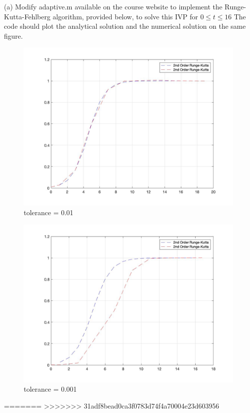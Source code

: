 \documentclass{article}
\begin{document}
\noindent
(a) Modify adaptive.m available on the course website to implement the Runge-Kutta-Fehlberg algorithm, provided below, to solve this IVP for $0 \leq t \leq 16$ The code should plot the analytical solution and the numerical solution on the same figure.



\begin{figure}[H]
  \includegraphics[width=\linewidth]{docs/01-rfk.jpg}
  \caption{tolerance = 0.01}
\end{figure}


\begin{figure}[H]
  \includegraphics[width=\linewidth]{docs/001-rfk.jpg}
  \caption{tolerance = 0.001}
\end{figure}


=======
>>>>>>> 31adf8bead0ca3f0783d74f4a70004e23d603956
\end{document}

